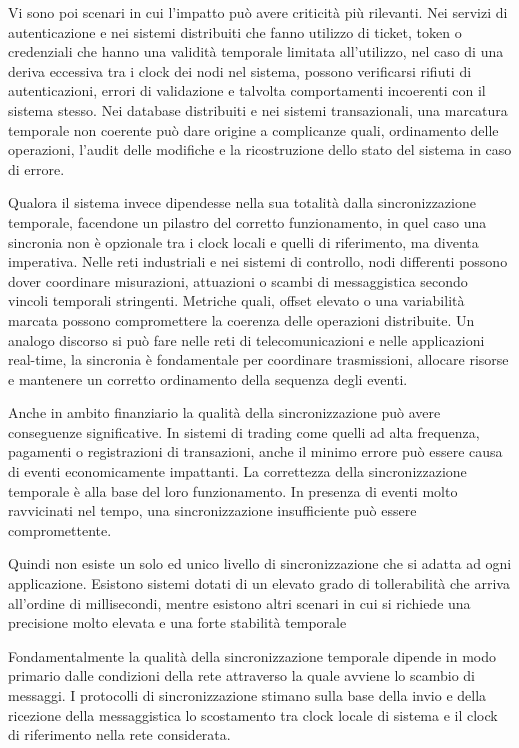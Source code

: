 Vi sono poi scenari in cui l'impatto può avere criticità più rilevanti. Nei servizi
di autenticazione e nei sistemi distribuiti che fanno utilizzo di ticket, token
o credenziali che hanno una validità temporale limitata all'utilizzo, nel caso di
una deriva eccessiva tra i clock dei nodi nel sistema, possono verificarsi
rifiuti di autenticazioni, errori di validazione e talvolta comportamenti incoerenti
con il sistema stesso. Nei database distribuiti e nei sistemi transazionali, una marcatura
temporale non coerente può dare origine a complicanze quali, ordinamento delle
operazioni, l'audit delle modifiche e la ricostruzione dello stato del sistema in
caso di errore.

Qualora il sistema invece dipendesse nella sua totalità dalla sincronizzazione temporale,
facendone un pilastro del corretto funzionamento, in quel caso una sincronia non è
opzionale tra i clock locali e quelli di riferimento, ma diventa imperativa. Nelle
reti industriali e nei sistemi di controllo, nodi differenti possono dover
coordinare misurazioni, attuazioni o scambi di messaggistica secondo vincoli temporali
stringenti. Metriche quali, offset elevato o una variabilità marcata possono compromettere
la coerenza delle operazioni distribuite. Un analogo discorso si può fare nelle
reti di telecomunicazioni e nelle applicazioni real-time, la sincronia è fondamentale
per coordinare trasmissioni, allocare risorse e mantenere un corretto
ordinamento della sequenza degli eventi.

Anche in ambito finanziario la qualità della sincronizzazione può avere
conseguenze significative. In sistemi di trading come quelli ad alta frequenza,
pagamenti o registrazioni di transazioni, anche il minimo errore può essere causa
di eventi economicamente impattanti. La correttezza della sincronizzazione
temporale è alla base del loro funzionamento. In presenza di eventi molto ravvicinati
nel tempo, una sincronizzazione insufficiente può essere compromettente.

Quindi non esiste un solo ed unico livello di sincronizzazione che si adatta ad ogni 
applicazione. Esistono sistemi dotati di un elevato grado di tollerabilità che arriva
all'ordine di millisecondi, mentre esistono altri scenari in cui si richiede una precisione
molto elevata e una forte stabilità temporale

Fondamentalmente la qualità della sincronizzazione temporale dipende in modo
primario dalle condizioni della rete attraverso la quale avviene lo scambio di
messaggi. I protocolli di sincronizzazione stimano sulla base della invio e della
ricezione della messaggistica lo scostamento tra clock locale di sistema e il clock
di riferimento nella rete considerata.


